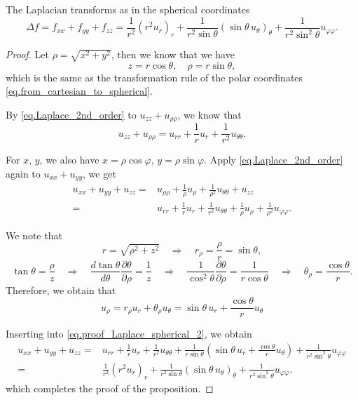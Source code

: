 \begin{proposition}[]
The Laplacian transforms as in the spherical coordinates
\begin{equation}\label{eq.Laplace_spherical_2nd_order}
    \Delta f = f_{xx} + f_{yy} + f_{zz} = \frac{1}{r^2} \left(r^2 u_r\right)_r + \frac{1}{r^2 \sin \theta} \left(\sin \theta\, u_\theta\right)_\theta+\frac{1}{r^2 \sin ^2 \theta} u_{\varphi \varphi}.
\end{equation}
\end{proposition}
\begin{proof} Let $\rho = \sqrt{x^2 + y^2}$, then we know that we have
$$
    z=r \cos \theta, \quad \rho=r \sin \theta,
$$
which is the same as the transformation rule of the polar coordinates \eqref{eq.from_cartesian_to_spherical}.
    
By \eqref{eq.Laplace_2nd_order} to $u_{z z}+u_{\rho \rho}$, we know that
\begin{equation}\label{eq.proof_Laplace_spherical_1}
    u_{z z}+u_{\rho \rho}=u_{r r}+\frac{1}{r} u_r+\frac{1}{r^2} u_{\theta \theta}.
\end{equation}
    
    
For $x$, $y$, we also have $x=\rho \cos \varphi$, $y=\rho \sin \varphi$. Apply \eqref{eq.Laplace_2nd_order} again to $u_{x x}+u_{y y}$, we get
\begin{equation}\label{eq.proof_Laplace_spherical_2}
\begin{split}
    u_{x x}+u_{y y}+u_{z z} =& u_{\rho \rho}+\frac{1}{\rho} u_\rho + \frac{1}{\rho^2} u_{\theta \theta} + u_{z z}
    \\
    =&u_{r r}+\frac{1}{r} u_r+\frac{1}{r^2} u_{\theta \theta}+\frac{1}{\rho} u_\rho+\frac{1}{\rho^2} u_{\varphi \varphi}.
\end{split}
\end{equation}
    
We note that  
$$
    r=\sqrt{\rho^2+z^2} \quad\Rightarrow\quad r_\rho=\frac{\rho}{r} = \sin\theta, 
$$  
$$
    \tan \theta=\frac{\rho}{z} \quad\Rightarrow\quad \frac{d \tan \theta}{d \theta} \frac{\partial \theta}{\partial \rho}=\frac{1}{z} \quad\Rightarrow\quad \frac{1}{\cos ^2 \theta} \frac{\partial \theta}{\partial \rho}=\frac{1}{r \cos \theta} \quad\Rightarrow\quad \theta_\rho=\frac{\cos \theta}{r}.
$$
Therefore, we obtain that 
$$
    u_\rho = r_\rho u_r + \theta_\rho u_\theta = \sin\theta\, u_r + \frac{\cos \theta}{r} u_\theta
$$

Inserting into \eqref{eq.proof_Laplace_spherical_2}, we obtain
\begin{equation}\label{eq.proof_Laplace_spherical_3}
\begin{split}
    u_{x x}+u_{y y}+u_{z z} =& u_{r r}+\frac{1}{r} u_r+\frac{1}{r^2} u_{\theta \theta}+\frac{1}{r\sin \theta} \left(\sin\theta\, u_r + \frac{\cos \theta}{r} u_\theta\right)+\frac{1}{r^2\sin^2 \theta} u_{\varphi \varphi}
    \\ 
    =& \frac{1}{r^2} \left(r^2 u_r\right)_r + \frac{1}{r^2 \sin \theta} \left(\sin \theta\, u_\theta\right)_\theta+\frac{1}{r^2 \sin ^2 \theta} u_{\varphi \varphi}.
\end{split}
\end{equation}
which completes the proof of the proposition.
\end{proof}


